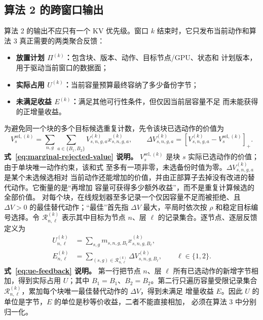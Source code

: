 \documentclass[UTF8,11pt,a4paper,fontset=fandol]{ctexart}
\newcommand{\pos}[1]{\left[#1\right]_+}
\newcommand{\BOne}{B_1}
\newcommand{\BTwo}{B_2}
\begin{document}
\subsection{算法 2 的跨窗口输出}

算法 2 的输出不应只有一个 KV 优先级。窗口 $k$ 结束时，它只发布当前动作和算法 3
真正需要的两类聚合反馈：

\begin{itemize}
  \item \textbf{放置计划 $\Pi^{(k)}$：}包含块、版本、动作、目标节点/GPU、状态和
    计划版本，用于驱动当前窗口的数据面；
  \item \textbf{实际占用 $U^{(k)}$：}当前容量预算最终容纳了多少备份字节；
  \item \textbf{未满足收益 $E^{(k)}$：}满足其他可行性条件，但仅因当前层容量不足
    而未能获得的正增量收益。
\end{itemize}

为避免同一个块的多个目标候选重复计数，先令该块已选动作的价值为
\begin{equation}
  V_s^{\mathrm{sel},(k)}
    =\sum_{n,g}\sum_{a\in\{\BOne,\BTwo\}}
      V_{s,n,g,a}^{(k)}x_{s,n,g,a}^{(k)},
  \qquad
  \Delta V_{s,n,g,a}^{(k)}
    =\pos{V_{s,n,g,a}^{(k)}-V_s^{\mathrm{sel},(k)}}.
  \label{eq:marginal-rejected-value}
\end{equation}
\noindent\textbf{式~\eqref{eq:marginal-rejected-value} 说明。}
$V_s^{\mathrm{sel},(k)}$ 是块 $s$ 实际已选动作的价值；由于单块唯一动作约束，该和式
至多有一项非零，未选备份时值为零。$\Delta V_{s,n,g,a}^{(k)}$ 是某个未选候选相对
当前动作还能增加的价值，并由正部算子去掉没有改进的替代动作。它衡量的是“再增加
容量可获得多少额外收益”，而不是重复计算候选的全部价值。
对每个块，在线规划器至多记录一个仅因容量不足而被拒绝、且
$\Delta V>0$ 的最佳替代动作；“最佳”首先指 $\Delta V$ 最大，平局时依次按 $\rho$
和稳定目标编号选择。令 $\mathcal R_{n,\ell}^{(k)}$ 表示其中目标为节点
$n$、层 $\ell$ 的记录集合。逐节点、逐层反馈定义为
\begin{equation}
  \begin{aligned}
    U_{n,\ell}^{(k)}
      &=\sum_{s,g}m_{s,n,g,B_\ell}
        x_{s,n,g,B_\ell}^{(k)},\\
    E_{n,\ell}^{(k)}
      &=\sum_{(s,g)\in\mathcal R_{n,\ell}^{(k)}}
        \Delta V_{s,n,g,B_\ell}^{(k)},
      \qquad \ell\in\{1,2\}.
  \end{aligned}
  \label{eq:ue-feedback}
\end{equation}
\noindent\textbf{式~\eqref{eq:ue-feedback} 说明。}
第一行把节点 $n$、层 $\ell$ 所有已选动作的新增字节相加，得到实际占用 $U$；其中
$B_1=\BOne$、$B_2=\BTwo$。第二行只遍历容量受限记录集合
$\mathcal R_{n,\ell}^{(k)}$，累加每个块唯一最佳替代动作的 $\Delta V$，得到未满足
增量收益 $E$。因此 $U$ 的单位是字节，$E$ 的单位是秒等价收益，二者不能直接相加，
必须在算法 3 中分别归一化。
\end{document}
